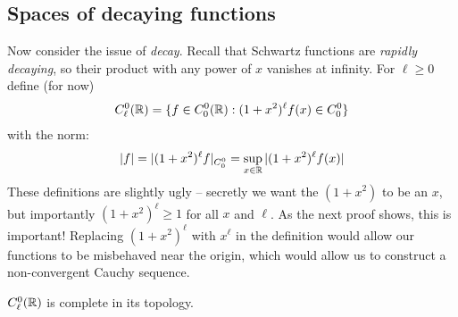     \subsection{Spaces of decaying functions}
      \label{sec:decayfunc}
      Now consider the issue of \emph{decay}.
      Recall that Schwartz functions are \emph{rapidly decaying}, so their product with any power of $x$ vanishes at infinity.
      For $\ell\ge0$ define (for now)
      \begin{align*}
        C^0_\ell(\mathbb{R}) = \{f\in C^0_0(\mathbb{R}):(1+x^2)^\ell f(x)\in C^0_0\}
      \end{align*}
      with the norm:
      \begin{align*}
        |f| = |(1+x^2)^\ell f|_{C^0_0} = \sup_{x\in\mathbb{R}} |(1+x^2)^\ell f(x)|
      \end{align*}
      These definitions are slightly ugly -- secretly we want the $(1+x^2)$ to be an $x$, but importantly $(1+x^2)^\ell\ge1$ for all $x$ and $\ell$.
      As the next proof shows, this is important!
      Replacing $(1+x^2)^\ell$ with $x^\ell$ in the definition would allow our functions to be misbehaved near the origin, which would allow us to construct a non-convergent Cauchy sequence.
      \begin{thm}
        \label{thm:c0lcomplete}
        $C^0_\ell(\mathbb{R})$ is complete in its topology.
      \end{thm}
